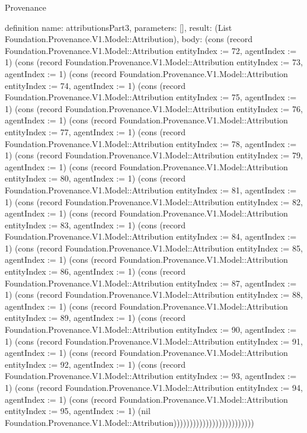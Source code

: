 \begin{lexlean}{Provenance}
\begin{semanticmodule}
definition{
  name: attributionsPart3,
  parameters: [],
  result: (List Foundation.Provenance.V1.Model::Attribution),
  body: (cons (record Foundation.Provenance.V1.Model::Attribution {entityIndex := 72, agentIndex := 1}) (cons (record Foundation.Provenance.V1.Model::Attribution {entityIndex := 73, agentIndex := 1}) (cons (record Foundation.Provenance.V1.Model::Attribution {entityIndex := 74, agentIndex := 1}) (cons (record Foundation.Provenance.V1.Model::Attribution {entityIndex := 75, agentIndex := 1}) (cons (record Foundation.Provenance.V1.Model::Attribution {entityIndex := 76, agentIndex := 1}) (cons (record Foundation.Provenance.V1.Model::Attribution {entityIndex := 77, agentIndex := 1}) (cons (record Foundation.Provenance.V1.Model::Attribution {entityIndex := 78, agentIndex := 1}) (cons (record Foundation.Provenance.V1.Model::Attribution {entityIndex := 79, agentIndex := 1}) (cons (record Foundation.Provenance.V1.Model::Attribution {entityIndex := 80, agentIndex := 1}) (cons (record Foundation.Provenance.V1.Model::Attribution {entityIndex := 81, agentIndex := 1}) (cons (record Foundation.Provenance.V1.Model::Attribution {entityIndex := 82, agentIndex := 1}) (cons (record Foundation.Provenance.V1.Model::Attribution {entityIndex := 83, agentIndex := 1}) (cons (record Foundation.Provenance.V1.Model::Attribution {entityIndex := 84, agentIndex := 1}) (cons (record Foundation.Provenance.V1.Model::Attribution {entityIndex := 85, agentIndex := 1}) (cons (record Foundation.Provenance.V1.Model::Attribution {entityIndex := 86, agentIndex := 1}) (cons (record Foundation.Provenance.V1.Model::Attribution {entityIndex := 87, agentIndex := 1}) (cons (record Foundation.Provenance.V1.Model::Attribution {entityIndex := 88, agentIndex := 1}) (cons (record Foundation.Provenance.V1.Model::Attribution {entityIndex := 89, agentIndex := 1}) (cons (record Foundation.Provenance.V1.Model::Attribution {entityIndex := 90, agentIndex := 1}) (cons (record Foundation.Provenance.V1.Model::Attribution {entityIndex := 91, agentIndex := 1}) (cons (record Foundation.Provenance.V1.Model::Attribution {entityIndex := 92, agentIndex := 1}) (cons (record Foundation.Provenance.V1.Model::Attribution {entityIndex := 93, agentIndex := 1}) (cons (record Foundation.Provenance.V1.Model::Attribution {entityIndex := 94, agentIndex := 1}) (cons (record Foundation.Provenance.V1.Model::Attribution {entityIndex := 95, agentIndex := 1}) (nil Foundation.Provenance.V1.Model::Attribution)))))))))))))))))))))))))
}


\end{semanticmodule}
\end{lexlean}
